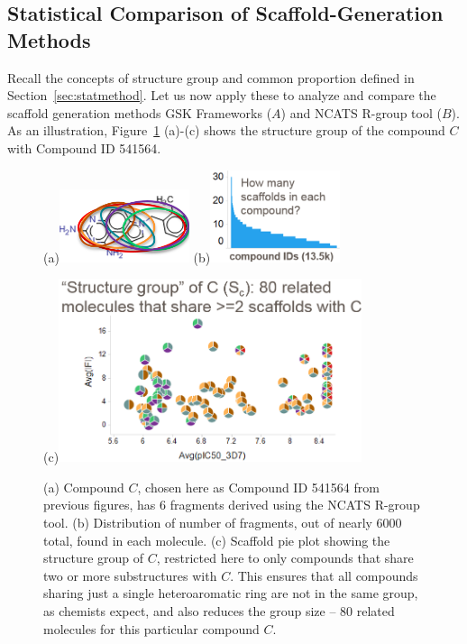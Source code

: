 \documentclass[journal=jacsat,manuscript=article]{achemso}
\newcommand*\fref[1]{Figure~\ref{fig:#1}}
\newcommand*\sref[1]{Section~\ref{sec:#1}}
\begin{document}
\subsection{Statistical Comparison of Scaffold-Generation Methods}\label{sec:statcomp}

Recall the concepts of structure group and common proportion defined in \sref{statmethod}.  Let us now apply these to analyze and compare the scaffold generation methods GSK Frameworks ($A$) and NCATS R-group tool ($B$). As an illustration, \fref{strucgroup} (a)-(c) shows the structure group of the compound $C$ with Compound ID 541564. 
\begin{figure}
\centering
  \begin{minipage}[b][0.2\textheight][s]{0.3\textwidth}
  \centering
  (a)\includegraphics[width=1.5in]{fig/mol_6scaf.png}
  (b)\includegraphics[width=1.5in]{fig/howmany_scaf.png}
  \end{minipage}
  (c)\includegraphics[width=3.5in]{fig/structure_group_C.png}
  \caption{(a) Compound $C$, chosen here as Compound ID 541564 from previous figures, has 6 fragments derived using the NCATS R-group tool. (b) Distribution of number of fragments, out of nearly 6000 total, found in each molecule. (c) Scaffold pie plot showing the structure group of $C$, restricted here to only compounds that share two or more substructures with $C$. This ensures that all compounds sharing just a single heteroaromatic ring are not in the same group, as chemists expect, and also reduces the group size -- 80 related molecules for this particular compound $C$.}
    \label{fig:strucgroup}
\end{figure}
\end{document}
